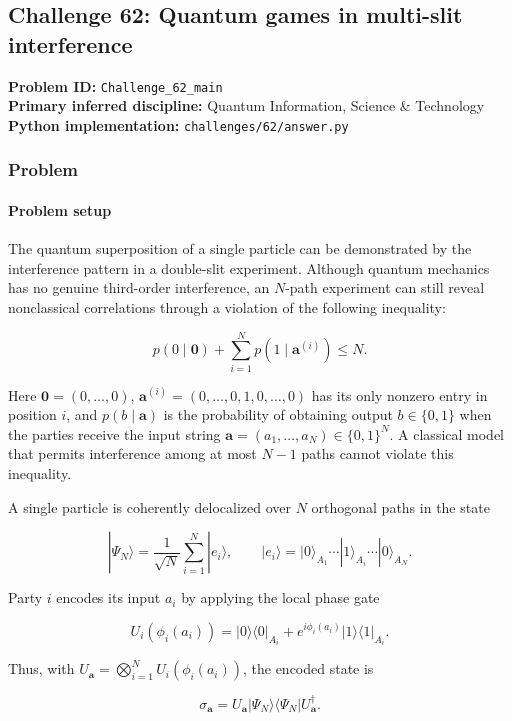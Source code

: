 \subsection[Challenge 62: Quantum games in multi-slit interference]{Challenge 62: Quantum games in multi-slit interference}
\textbf{Problem ID:} \texttt{Challenge\_62\_main}\\
\textbf{Primary inferred discipline:} Quantum Information, Science \& Technology\\
\textbf{Python implementation:} \texttt{challenges/62/answer.py}

\subsubsection*{Problem}
\paragraph*{Problem setup}
The quantum superposition of a single particle can be demonstrated by the
interference pattern in a double-slit experiment. Although quantum mechanics
has no genuine third-order interference, an $N$-path experiment can still
reveal nonclassical correlations through a violation of the following
inequality:

\[
p(0\mid \mathbf{0})
+ \sum_{i=1}^N p(1\mid \mathbf{a}^{(i)}) \leq N.
\]

Here $\mathbf{0}=(0,\ldots,0)$,
$\mathbf{a}^{(i)}=(0,\ldots,0,1,0,\ldots,0)$ has its only nonzero entry in
position $i$, and $p(b\mid\mathbf{a})$ is the probability of obtaining output
$b\in\{0,1\}$ when the parties receive the input string
$\mathbf{a}=(a_1,\ldots,a_N)\in\{0,1\}^N$. A classical model that permits
interference among at most $N-1$ paths cannot violate this inequality.

A single particle is coherently delocalized over $N$ orthogonal paths in the
state

\[
|\Psi_N\rangle=\frac{1}{\sqrt{N}}\sum_{i=1}^N|e_i\rangle,
\qquad
|e_i\rangle
=|0\rangle_{A_1}\cdots|1\rangle_{A_i}\cdots|0\rangle_{A_N}.
\]

Party $i$ encodes its input $a_i$ by applying the local phase gate

\[
U_i\!\left(\phi_i(a_i)\right)
=|0\rangle\!\langle0|_{A_i}
+e^{i\phi_i(a_i)}|1\rangle\!\langle1|_{A_i}.
\]

Thus, with
$U_{\mathbf a}=\bigotimes_{i=1}^N U_i\!\left(\phi_i(a_i)\right)$, the encoded
state is

\[
\sigma_{\mathbf a}
=U_{\mathbf a}|\Psi_N\rangle\!\langle\Psi_N|U_{\mathbf a}^{\dagger}.
\]

